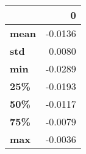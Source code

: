 \begin{tabular}{lr}
\toprule
{} &       0 \\
\midrule
\textbf{mean} & -0.0136 \\
\textbf{std } &  0.0080 \\
\textbf{min } & -0.0289 \\
\textbf{25\% } & -0.0193 \\
\textbf{50\% } & -0.0117 \\
\textbf{75\% } & -0.0079 \\
\textbf{max } & -0.0036 \\
\bottomrule
\end{tabular}
